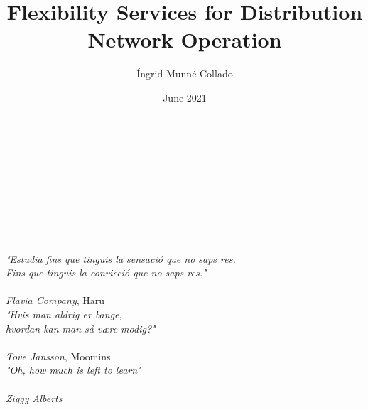 \documentclass{Classe/PhDCITCEA_web}
\title{Flexibility Services for Distribution Network Operation}
\author{\'Ingrid Munn\'e Collado}
\date{June 2021}
\begin{document}
\cleardoubleemptypage


\maketitle

\cleardoubleemptypage

%

\clearpage
$ $
\\$ $
\\$ $
\\$ $
\\$ $
\\$ $
\\$ $

\begin{large}
{\raggedleft
\textit{"Estudia fins que tinguis la sensaci\'o que no saps res.\\ Fins que tinguis la convicci\'o que no saps res."\\~ \\Flavia Company}, Haru\\}
\vspace{2cm}
{\raggedleft
\textit{"Hvis man aldrig er bange,\\ hvordan kan man s{\aa} v{\ae}re modig?"\\ ~ \\Tove Jansson}, Moomins\\}
\vspace{2cm}
{\raggedleft
\textit{"Oh, how much is left to learn"\\ ~ \\ Ziggy Alberts}\\}
\vspace{2cm}
\end{large}

\clearpage
\end{document}

